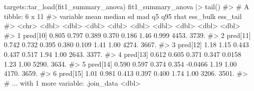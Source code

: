 \documentclass[
  11pt,
  letterpaper,
  DIV=11,
  numbers=noendperiod]{scrartcl}
\newenvironment{Shaded}{}{}
\newcommand{\CommentTok}[1]{\textcolor[rgb]{0.42,0.45,0.49}{#1}}
\newcommand{\FunctionTok}[1]{\textcolor[rgb]{0.44,0.26,0.76}{#1}}
\newcommand{\NormalTok}[1]{\textcolor[rgb]{0.14,0.16,0.18}{#1}}
\newcommand{\SpecialCharTok}[1]{\textcolor[rgb]{0.00,0.36,0.77}{#1}}
\begin{document}
\begin{Shaded}
\begin{Highlighting}[]
\NormalTok{targets}\SpecialCharTok{::}\FunctionTok{tar\_load}\NormalTok{(fit1\_summary\_anova)}
\NormalTok{fit1\_summary\_anova }\SpecialCharTok{|\textgreater{}} \FunctionTok{tail}\NormalTok{()}
\CommentTok{\#\textgreater{} \# A tibble: 6 x 11}
\CommentTok{\#\textgreater{}   variable  mean median    sd   mad      q5   q95  rhat ess\_bulk ess\_tail}
\CommentTok{\#\textgreater{}   \textless{}chr\textgreater{}    \textless{}dbl\textgreater{}  \textless{}dbl\textgreater{} \textless{}dbl\textgreater{} \textless{}dbl\textgreater{}   \textless{}dbl\textgreater{} \textless{}dbl\textgreater{} \textless{}dbl\textgreater{}    \textless{}dbl\textgreater{}    \textless{}dbl\textgreater{}}
\CommentTok{\#\textgreater{} 1 pred[10] 0.805  0.797 0.389 0.370  0.186   1.46 0.999    4453.    3739.}
\CommentTok{\#\textgreater{} 2 pred[11] 0.742  0.732 0.395 0.380  0.109   1.41 1.00     4274.    3667.}
\CommentTok{\#\textgreater{} 3 pred[12] 1.18   1.15  0.443 0.437  0.517   1.94 1.00     2643.    3377.}
\CommentTok{\#\textgreater{} 4 pred[13] 0.612  0.605 0.371 0.347  0.0158  1.23 1.00     5290.    3634.}
\CommentTok{\#\textgreater{} 5 pred[14] 0.590  0.597 0.374 0.354 {-}0.0466  1.19 1.00     4170.    3659.}
\CommentTok{\#\textgreater{} 6 pred[15] 1.01   0.981 0.413 0.397  0.400   1.74 1.00     3206.    3501.}
\CommentTok{\#\textgreater{} \# ... with 1 more variable: .join\_data \textless{}dbl\textgreater{}}
\end{Highlighting}
\end{Shaded}
\end{document}
